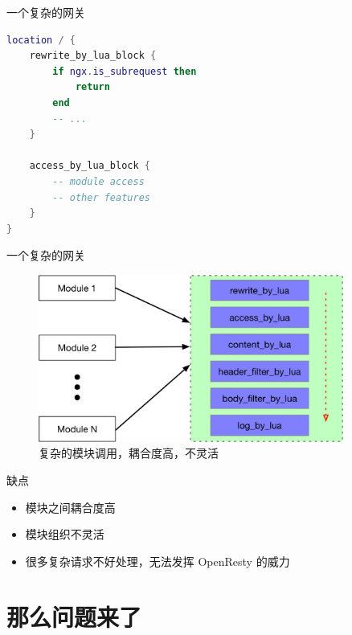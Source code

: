 \documentclass[aspectratio=32]{beamer}
\begin{document}
\begin{frame}[standout]
\end{frame}

\begin{frame}[fragile]{一个复杂的网关}
\small
\begin{lstlisting}[language=lua]
location / {
    rewrite_by_lua_block {
        if ngx.is_subrequest then
            return
        end
        -- ...
    }

    access_by_lua_block {
        -- module access
        -- other features
    }
}
\end{lstlisting}
\end{frame}

\begin{frame}[fragile]{一个复杂的网关}
\begin{center}
  \begin{figure}[htlp]
    \includegraphics[width=0.9\textwidth]{complex_bad.png}
    \caption{复杂的模块调用，耦合度高，不灵活}
  \end{figure}
\end{center}
\end{frame}

\begin{frame}{缺点}
\begin{itemize}
  \item 模块之间耦合度高
  \item 模块组织不灵活
  \item 很多复杂请求不好处理，无法发挥 OpenResty 的威力
\end{itemize}
\end{frame}

\section{那么问题来了}
\end{document}
